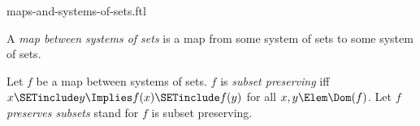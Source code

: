 \documentclass{stex}
\begin{document}
\begin{smodule}{maps-and-systems-of-sets.ftl}

\begin{definition}[forthel]
  A \emph{map between systems of sets} is a map from some system of sets to some system of sets.
\end{definition}

\begin{definition}[forthel]
  Let $f$ be a map between systems of sets.
  $f$ is \emph{subset preserving} iff $x \SETinclude y \Implies f(x) \SETinclude f(y)$ for all $x, y \Elem \Dom(f)$.
  Let $f$ \emph{preserves subsets} stand for $f$ is subset preserving.
\end{definition}
\end{smodule}
\end{document}
